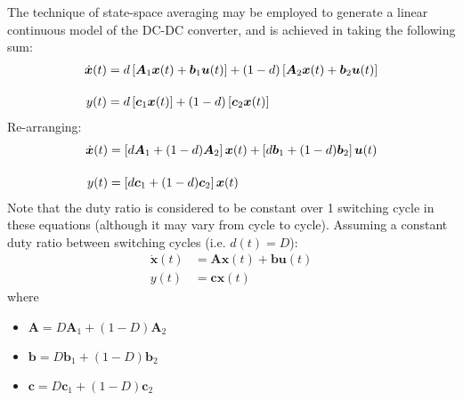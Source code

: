 The technique of state-space averaging may be employed to generate a linear continuous model of the DC-DC converter, and is achieved in taking the following sum:
\begin{align*}
\dot{\boldsymbol{x}}(t)
&= d \left[\boldsymbol{A}_1 \boldsymbol{x}(t) + \boldsymbol{b}_1 \boldsymbol{u}(t)\right]
+ (1 - d) \left[\boldsymbol{A}_2 \boldsymbol{x}(t) + \boldsymbol{b}_2 \boldsymbol{u}(t)\right]
\\[11pt]
y(t) &= d \left[\boldsymbol{c}_1 \boldsymbol{x}(t)\right] + (1 - d) \left[\boldsymbol{c}_2 \boldsymbol{x}(t)\right]
\end{align*}
Re-arranging:
\begin{align*}
\dot{\boldsymbol{x}}(t)
&= \left[d \boldsymbol{A}_1 + (1 - d) \boldsymbol{A}_2\right]\boldsymbol{x}(t)
+ \left[d \boldsymbol{b}_1 + (1 - d) \boldsymbol{b}_2\right]\boldsymbol{u}(t)
\\[11pt]
y(t) &= \left[d\boldsymbol{c}_1 + (1 - d) \boldsymbol{c}_2\right] \boldsymbol{x}(t)
\end{align*}
Note that the duty ratio is considered to be constant over 1 switching cycle in these equations (although it may vary from cycle to cycle).
\newpar
Assuming a constant duty ratio between switching cycles (i.e. $d(t) = D$):
\begin{align}
\dot{\boldsymbol{x}}(t)
&= \boldsymbol{A} \boldsymbol{x}(t) + \boldsymbol{b} \boldsymbol{u}(t) \nonumber
\\[11pt]
y(t) &= \boldsymbol{c} \boldsymbol{x}(t) \label{eqn:averaging}
\end{align}
where
\begin{itemize}
\item $\boldsymbol{A} = D \boldsymbol{A}_1 + (1 - D) \boldsymbol{A}_2$
\item $\boldsymbol{b} = D \boldsymbol{b}_1 + (1 - D) \boldsymbol{b}_2$
\item $\boldsymbol{c} = D \boldsymbol{c}_1 + (1 - D) \boldsymbol{c}_2$
\end{itemize}
